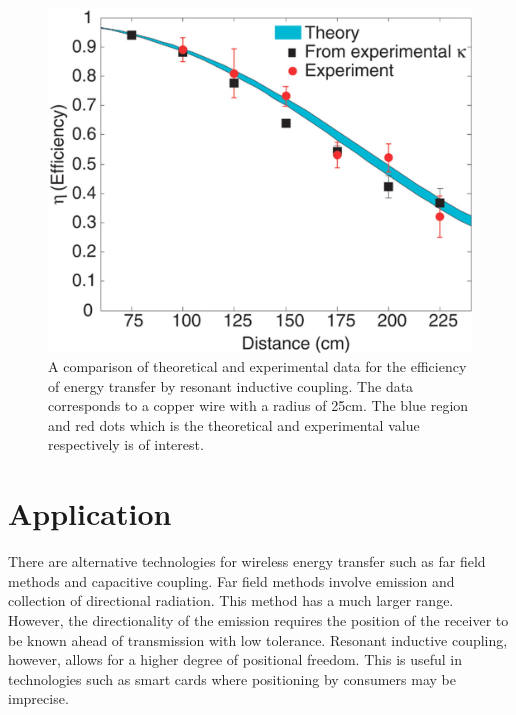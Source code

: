 \documentclass[a4paper,justified,nobib]{tufte-handout}
\begin{document}
\begin{figure}
  \includegraphics[scale=0.22]{images/Experimental.jpg}
  \caption{A comparison of theoretical and experimental data for the efficiency
  of energy transfer by resonant inductive coupling.
  The data corresponds to a copper wire with a radius of 25cm.
  The blue region and red dots which is the theoretical
  and experimental value respectively is of interest.\cite{StrongCouple}}
  \label{fig:efficiency}
\end{figure}

\section{Application}

There are alternative technologies for wireless energy transfer such as far field methods
and capacitive coupling.
Far field methods involve emission and collection of directional radiation.
This method has a much larger range.
However, the directionality of the emission requires the position of the receiver to
be known ahead of transmission with low tolerance.
Resonant inductive coupling, however, allows for a higher degree of positional freedom.
This is useful in technologies such as smart cards where positioning by consumers
may be imprecise.
\end{document}
